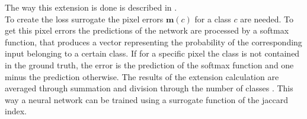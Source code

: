 The way this extension is done is described in \cite{Lovasz1983}.\\ %
To create the loss surrogate the pixel errors $\mathbf{m}(c)$ for a class $c$ are needed.
To get this pixel errors the predictions of the network are processed by a softmax function, that produces a vector representing the probability of the corresponding input belonging to a certain class. 
If for a specific pixel the class is not contained in the ground truth, the error is the prediction of the softmax function and one minus the prediction otherwise.
The results of the extension calculation are averaged through summation and division through the number of classes \cite{Berman2017}.
This way a neural network can be trained using a surrogate function of the jaccard index.
